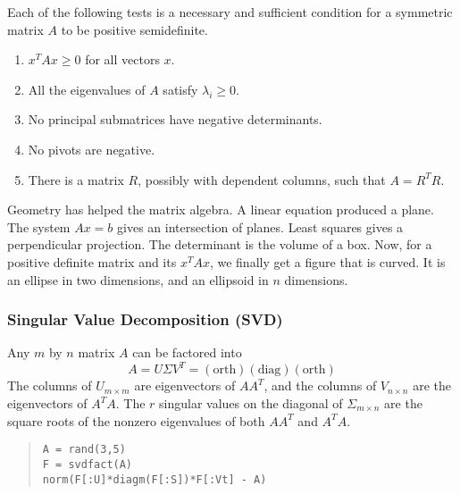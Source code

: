  Each of the following tests is a necessary and sufficient
 condition for a symmetric matrix $A$ to be positive
 semidefinite.
 \begin{enumerate}
 \item $x^TAx\geq 0$ for all vectors $x$.
 \item All the eigenvalues of $A$ satisfy $\lambda_i\geq 0$.
 \item No principal submatrices have negative determinants.
 \item No pivots are negative.
 \item There is a matrix $R$, possibly with dependent columns,
	 such that $A=R^TR$.
 \end{enumerate}

 Geometry has helped the matrix algebra. A linear equation
 produced a plane. The system $Ax=b$ gives an intersection of
 planes. Least squares gives a perpendicular projection. The
 determinant is the volume of a box. Now, for a positive definite
 matrix and its $x^TAx$, we finally get a figure that is curved.
 It is an ellipse in two dimensions, and an ellipsoid in $n$
 dimensions.


 \subsubsection{Singular Value Decomposition (SVD)}

 Any $m$ by $n$ matrix $A$ can be factored into
 $$A=U\Sigma V^T = (\text{orth})(\text{diag})(\text{orth})$$
 The columns of $U_{m\times m}$ are eigenvectors of $AA^T$, and
 the columns of $V_{n\times n}$ are the eigenvectors of $A^TA$.
 The $r$ singular values on the diagonal of $\Sigma_{m\times n}$
 are the square roots of the nonzero eigenvalues of both
 $AA^T$ and $A^TA$.

 \begin{quote}\begin{lstlisting}
A = rand(3,5)
F = svdfact(A)
norm(F[:U]*diagm(F[:S])*F[:Vt] - A)
 \end{lstlisting}\end{quote}




%



